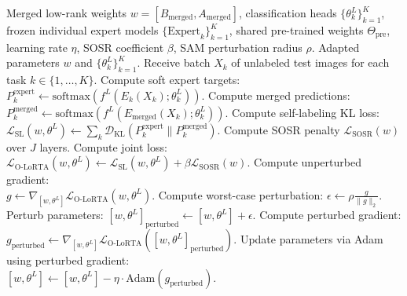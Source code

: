 \documentclass{article}
\theoremstyle{plain}
\theoremstyle{definition}
\theoremstyle{remark}
\begin{document}
\begin{algorithm}[tb]
  \caption{O-LoRTA Test-Time Adaptation Loop}
  \label{alg:olorta}
  \begin{algorithmic}[1]
    \REQUIRE Merged low-rank weights $w = [B_{\text{merged}}, A_{\text{merged}}]$, classification heads $\{\theta^L_k\}_{k=1}^K$, frozen individual expert models $\{\text{Expert}_k\}_{k=1}^K$, shared pre-trained weights $\Theta_{\text{pre}}$, learning rate $\eta$, SOSR coefficient $\beta$, SAM perturbation radius $\rho$.
    \ENSURE Adapted parameters $w$ and $\{\theta^L_k\}_{k=1}^K$.
      \STATE Receive batch $X_k$ of unlabeled test images for each task $k \in \{1,\dots,K\}$.
      \STATE Compute soft expert targets: \\
      $P^{\text{expert}}_k \leftarrow \text{softmax}(f^L(E_k(X_k); \theta^L_k))$.
      \STATE Compute merged predictions: \\
      $P^{\text{merged}}_k \leftarrow \text{softmax}(f^L(E_{\text{merged}}(X_k); \theta^L_k))$.
      \STATE Compute self-labeling KL loss: \\
      $\mathcal{L}_{\text{SL}}(w, \theta^L) \leftarrow \sum_k \mathcal{D}_{\text{KL}}(P^{\text{expert}}_k \parallel P^{\text{merged}}_k)$.
      \STATE Compute SOSR penalty $\mathcal{L}_{\text{SOSR}}(w)$ over $J$ layers.
      \STATE Compute joint loss: \\
      $\mathcal{L}_{\text{O-LoRTA}}(w, \theta^L) \leftarrow \mathcal{L}_{\text{SL}}(w, \theta^L) + \beta \mathcal{L}_{\text{SOSR}}(w)$.
      \STATE Compute unperturbed gradient: \\
      $g \leftarrow \nabla_{[w, \theta^L]} \mathcal{L}_{\text{O-LoRTA}}(w, \theta^L)$.
      \STATE Compute worst-case perturbation: $\epsilon \leftarrow \rho \frac{g}{\| g \|_2}$.
      \STATE Perturb parameters: $[w, \theta^L]_{\text{perturbed}} \leftarrow [w, \theta^L] + \epsilon$.
      \STATE Compute perturbed gradient: \\
      $g_{\text{perturbed}} \leftarrow \nabla_{[w, \theta^L]} \mathcal{L}_{\text{O-LoRTA}}([w, \theta^L]_{\text{perturbed}})$.
      \STATE Update parameters via Adam using perturbed gradient: \\
      $[w, \theta^L] \leftarrow [w, \theta^L] - \eta \cdot \text{Adam}(g_{\text{perturbed}})$.
    \ENDFOR
  \end{algorithmic}
\end{algorithm}
\end{document}
